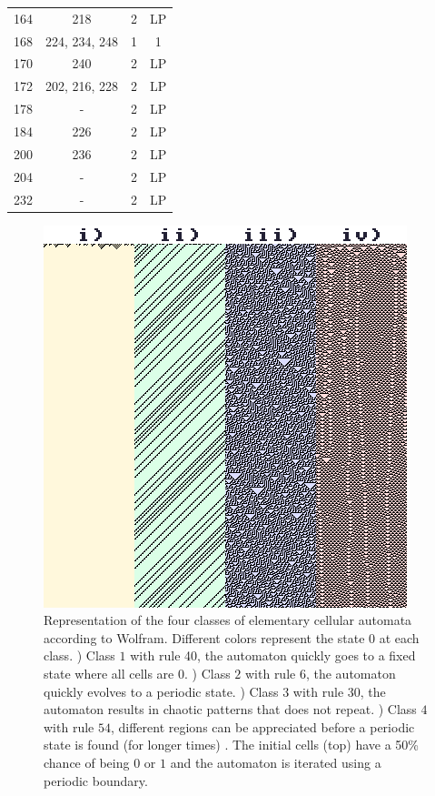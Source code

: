 \begin{table}
\begin{tabular}{|c|c|c|c}
        164 & 218 & 2 & LP \\
        168 & 224, 234, 248 & 1 & 1 \\
        170 & 240 & 2 & LP \\
        172 & 202, 216, 228 & 2 & LP \\
        178 & - & 2 & LP \\
        184 & 226 & 2 & LP \\
        200 & 236 & 2 & LP \\
        204 & - & 2 & LP \\
        232 & - & 2 & LP \\
    \end{tabular}
\end{table}





\begin{figure}
    \centering
    \includegraphics[width=\textwidth]{Images/P4/4classes.png}
    \caption{Representation of the four classes of elementary cellular automata according to Wolfram. Different colors represent the state $0$ at each class. ) Class $1$ with rule 40, the automaton quickly goes to a fixed state where all cells are $0$. ) Class $2$ with rule $6$, the automaton quickly evolves to a periodic state. ) Class $3$ with rule 30, the automaton results in chaotic patterns that does not repeat. ) Class $4$ with rule $54$, different regions can be appreciated before a periodic state is found (for longer times) . The initial cells (top) have a 50\% chance of being $0$ or $1$ and the automaton is iterated using a periodic boundary. }
    \label{fig:4classes}
\end{figure}





